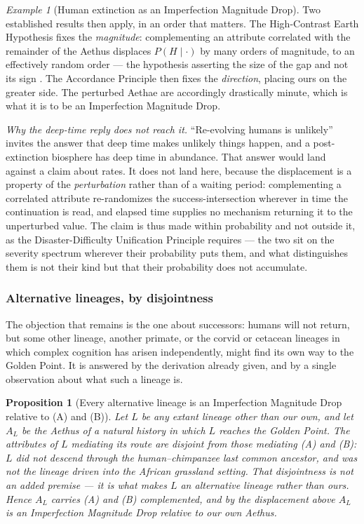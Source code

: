 \documentclass[11pt]{article}
\numberwithin{equation}{section}
\theoremstyle{plain}
\newtheorem{proposition}[theorem]{Proposition}
\theoremstyle{definition}
\theoremstyle{remark}
\newtheorem{example}[theorem]{Example}
\begin{document}
\begin{example}[Human extinction as an Imperfection Magnitude Drop]
Two established results then apply, in an order that matters. The
High-Contrast Earth Hypothesis fixes the \emph{magnitude}: complementing
an attribute correlated with the remainder of the Aethus displaces
$P(H\mid\cdot)$ by many orders of magnitude, to an effectively random
order --- the hypothesis asserting the size of the gap and not its sign
\cite{Nexus}. The Accordance Principle then fixes the \emph{direction},
placing ours on the greater side. The perturbed Aethae are accordingly
drastically minute, which is what it is to be an Imperfection Magnitude
Drop.

\emph{Why the deep-time reply does not reach it.} ``Re-evolving humans
is unlikely'' invites the answer that deep time makes unlikely things
happen, and a post-extinction biosphere has deep time in abundance. That
answer would land against a claim about rates. It does not land here,
because the displacement is a property of the \emph{perturbation} rather
than of a waiting period: complementing a correlated attribute
re-randomizes the success-intersection wherever in time the continuation
is read, and elapsed time supplies no mechanism returning it to the
unperturbed value. The claim is thus made within probability and not
outside it, as the Disaster-Difficulty Unification Principle requires
--- the two sit on the severity spectrum wherever their probability puts
them, and what distinguishes them is not their kind but that their
probability does not accumulate.

\subsubsection{Alternative lineages, by disjointness}
\label{gc:subsub:disjointness}

The objection that remains is the one about successors: humans will not
return, but some other lineage, another primate, or the corvid or
cetacean lineages in which complex cognition has arisen independently, might find its own way to the Golden Point. It is answered by the
derivation already given, and by a single observation about what such a
lineage is.

\begin{proposition}[Every alternative lineage is an Imperfection
Magnitude Drop relative to (A) and (B)]\label{gc:prop:disjoint}
Let $L$ be any extant lineage other than our own, and let $A_L$ be the
Aethus of a natural history in which $L$ reaches the Golden Point.
The attributes of $L$ mediating its route are \emph{disjoint} from
those mediating (A) and (B): $L$ did not descend through the
human--chimpanzee last common ancestor, and was not the lineage driven
into the African grassland setting. That disjointness is not an added
premise --- it is what makes $L$ an alternative lineage rather than
ours. Hence $A_L$ carries (A) and (B) complemented, and by the
displacement above $A_L$ is an Imperfection Magnitude Drop relative to
our own Aethus.
\end{proposition}


\end{example}
\end{document}

